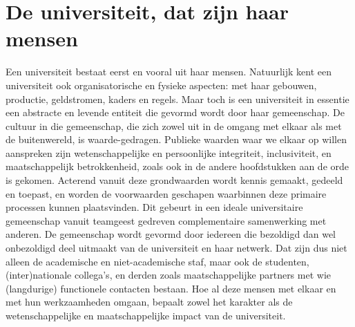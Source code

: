 \documentclass[empirical, authordate, ]{new-jote-article}
\begin{document}
	\section{De universiteit, dat zijn haar mensen }



	Een universiteit bestaat eerst en vooral uit haar mensen. Natuurlijk kent een universiteit ook organisatorische en fysieke aspecten: met haar gebouwen, productie, geldstromen, kaders en regels. Maar toch is een universiteit in essentie een abstracte en levende entiteit die gevormd wordt door haar gemeenschap. De cultuur in die gemeenschap, die zich zowel uit in de omgang met elkaar als met de buitenwereld, is waarde-gedragen. Publieke waarden waar we elkaar op willen aanspreken zijn wetenschappelijke en persoonlijke integriteit, inclusiviteit, en maatschappelijk betrokkenheid, zoals ook in de andere hoofdstukken aan de orde is gekomen. Acterend vanuit deze grondwaarden wordt kennis gemaakt, gedeeld en toepast, en worden de voorwaarden geschapen waarbinnen deze primaire processen kunnen plaatsvinden. Dit gebeurt in een ideale universitaire gemeenschap vanuit teamgeest gedreven complementaire samenwerking met anderen. De gemeenschap wordt gevormd door iedereen die bezoldigd dan wel onbezoldigd deel uitmaakt van de universiteit en haar netwerk. Dat zijn dus niet alleen de academische en niet-academische staf, maar ook de studenten, (inter)nationale collega's, en derden zoals maatschappelijke partners met wie (langdurige) functionele contacten bestaan. Hoe al deze mensen met elkaar en met hun werkzaamheden omgaan, bepaalt zowel het karakter als de wetenschappelijke en maatschappelijke impact van de universiteit.
\end{document}

